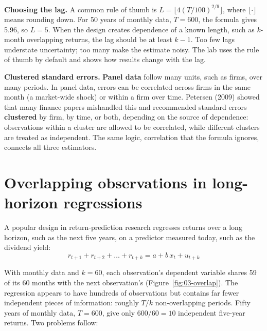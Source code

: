\textbf{Choosing the lag.} A common rule of thumb is $L = \lfloor 4(T/100)^{2/9} \rfloor$, where $\lfloor\cdot\rfloor$ means rounding down. For 50 years of monthly data, $T = 600$, the formula gives 5.96, so $L = 5$. When the design creates dependence of a known length, such as $k$-month overlapping returns, the lag should be at least $k - 1$. Too few lags understate uncertainty; too many make the estimate noisy. The lab uses the rule of thumb by default and shows how results change with the lag.

\textbf{Clustered standard errors.} \textbf{Panel data} follow many units, such as firms, over many periods. In panel data, errors can be correlated across firms in the same month (a market-wide shock) or within a firm over time. Petersen (2009) showed that many finance papers mishandled this and recommended standard errors \textbf{clustered} by firm, by time, or both, depending on the source of dependence: observations within a cluster are allowed to be correlated, while different clusters are treated as independent. The same logic, correlation that the formula ignores, connects all three estimators.

\section{Overlapping observations in long-horizon regressions}
\label{sec:03-overlap}

A popular design in return-prediction research regresses returns over a long horizon, such as the next five years, on a predictor measured today, such as the dividend yield:
\begin{equation}
  r_{t+1} + r_{t+2} + \dots + r_{t+k} = a + b\,x_t + u_{t+k}
  \label{eq:03-longhorizon}
\end{equation}

With monthly data and $k = 60$, each observation's dependent variable shares 59 of its 60 months with the next observation's (Figure~\ref{fig:03-overlap}). The regression appears to have hundreds of observations but contains far fewer independent pieces of information: roughly $T/k$ non-overlapping periods. Fifty years of monthly data, $T = 600$, give only $600/60 = 10$ independent five-year returns. Two problems follow:

